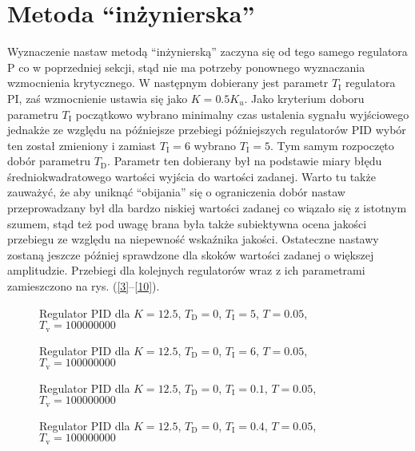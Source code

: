 \section{Metoda ``inżynierska''}
Wyznaczenie nastaw metodą ``inżynierską'' zaczyna się od tego samego regulatora P co w poprzedniej sekcji, stąd nie ma potrzeby ponownego wyznaczania wzmocnienia krytycznego. W następnym dobierany jest parametr $T_\mathrm{I}$ regulatora PI, zaś wzmocnienie ustawia się jako $K = \num{0.5}K_u$. Jako kryterium doboru parametru $T_\mathrm{I}$ początkowo wybrano minimalny czas ustalenia sygnału wyjściowego jednakże ze względu na późniejsze przebiegi późniejszych regulatorów PID wybór ten został zmieniony i zamiast $T_\mathrm{I} = 6$ wybrano $T_\mathrm{I} = 5$. Tym samym rozpoczęto dobór parametru $T_\mathrm{D}$. Parametr ten dobierany był na podstawie miary błędu średniokwadratowego wartości wyjścia do wartości zadanej. Warto tu także zauważyć, że aby uniknąć ``obijania'' się o ograniczenia dobór nastaw przeprowadzany był dla bardzo niskiej wartości zadanej co wiązało się z istotnym szumem, stąd też pod uwagę brana była także subiektywna ocena jakości przebiegu ze względu na niepewność wskaźnika jakości. Ostateczne nastawy zostaną jeszcze później sprawdzone dla skoków wartości zadanej o większej amplitudzie. Przebiegi dla kolejnych regulatorów wraz z ich parametrami zamieszczono na rys. (\ref{3}--\ref{10}).

\begin{figure}[H]
\centering

\label{R3}
\caption{Regulator PID dla $K = 12.5$, $T_\mathrm{D} = 0$, $T_\mathrm{I} = 5$, $T = 0.05$, $T_\mathrm{v} = 100000000$}
\end{figure}

\begin{figure}[H]
\centering

\label{R4}
\caption{Regulator PID dla $K = 12.5$, $T_\mathrm{D} = 0$, $T_\mathrm{I} = 6$, $T = 0.05$, $T_\mathrm{v} = 100000000$}
\end{figure}

\begin{figure}[H]
\centering

\label{R5}
\caption{Regulator PID dla $K = 12.5$, $T_\mathrm{D} = 0$, $T_\mathrm{I} = 0.1$, $T = 0.05$, $T_\mathrm{v} = 100000000$}
\end{figure}

\begin{figure}[H]
\centering

\label{R6}
\caption{Regulator PID dla $K = 12.5$, $T_\mathrm{D} = 0$, $T_\mathrm{I} = 0.4$, $T = 0.05$, $T_\mathrm{v} = 100000000$}
\end{figure}

